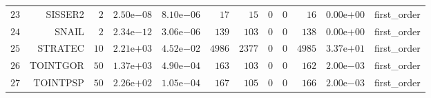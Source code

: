 \begin{longtable}{rrrrrrrrrrrr}
  \(    23\) & SISSER2 & \(     2\) & \( 2.50\)e\(-08\) & \( 8.10\)e\(-06\) & \(    17\) & \(    15\) & \(     0\) & \(     0\) & \(    16\) & \( 0.00\)e\(+00\) & first\_order \\
  \(    24\) & SNAIL & \(     2\) & \( 2.34\)e\(-12\) & \( 3.06\)e\(-06\) & \(   139\) & \(   103\) & \(     0\) & \(     0\) & \(   138\) & \( 0.00\)e\(+00\) & first\_order \\
  \(    25\) & STRATEC & \(    10\) & \( 2.21\)e\(+03\) & \( 4.52\)e\(-02\) & \(  4986\) & \(  2377\) & \(     0\) & \(     0\) & \(  4985\) & \( 3.37\)e\(+01\) & first\_order \\
  \(    26\) & TOINTGOR & \(    50\) & \( 1.37\)e\(+03\) & \( 4.90\)e\(-04\) & \(   163\) & \(   103\) & \(     0\) & \(     0\) & \(   162\) & \( 2.00\)e\(-03\) & first\_order \\
  \(    27\) & TOINTPSP & \(    50\) & \( 2.26\)e\(+02\) & \( 1.05\)e\(-04\) & \(   167\) & \(   105\) & \(     0\) & \(     0\) & \(   166\) & \( 2.00\)e\(-03\) & first\_order \\\hline
\end{longtable}
